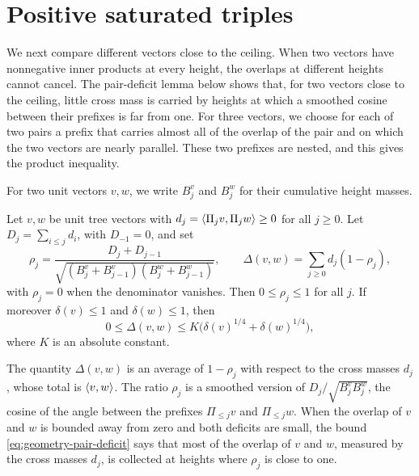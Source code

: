 \section{Positive saturated triples}

We next compare different vectors close to the ceiling. When two vectors have nonnegative inner products at every height, the overlaps at different heights cannot cancel. The pair-deficit lemma below shows that, for two vectors close to the ceiling, little cross mass is carried by heights at which a smoothed cosine between their prefixes is far from one. For three vectors, we choose for each of two pairs a prefix that carries almost all of the overlap of the pair and on which the two vectors are nearly parallel. These two prefixes are nested, and this gives the product inequality.

For two unit vectors $v,w$, we write $B^v_j$ and $B^w_j$ for their cumulative height masses.

\begin{lemma}
\label{lem:geometry-pair-deficit}
Let $v,w$ be unit tree vectors with $d_j=\left\langle\Pi_jv,\Pi_jw\right\rangle\ge0$ for all $j\ge0$. Let $D_j=\sum_{i\le j}d_i$, with $D_{-1}=0$, and set
\[
 \rho_j=\frac{D_j+D_{j-1}}{\sqrt{(B_j^v+B_{j-1}^v)(B_j^w+B_{j-1}^w)}},\qquad
 \Delta(v,w)=\sum_{j\ge0}d_j(1-\rho_j),
\]
with $\rho_j=0$ when the denominator vanishes. Then $0\le\rho_j\le1$ for all $j$. If moreover $\delta(v)\le1$ and $\delta(w)\le1$, then
\begin{equation}
 0\le\Delta(v,w)\le K\bigl(\delta(v)^{1/4}+\delta(w)^{1/4}\bigr),
 \label{eq:geometry-pair-deficit}
\end{equation}
where $K$ is an absolute constant.
\end{lemma}

The quantity $\Delta(v,w)$ is an average of $1-\rho_j$ with respect to the cross masses $d_j$, whose total is $\left\langle v,w\right\rangle$. The ratio $\rho_j$ is a smoothed version of $D_j/\sqrt{B^v_jB^w_j}$, the cosine of the angle between the prefixes $\Pi_{\le j}v$ and $\Pi_{\le j}w$. When the overlap of $v$ and $w$ is bounded away from zero and both deficits are small, the bound \eqref{eq:geometry-pair-deficit} says that most of the overlap of $v$ and $w$, measured by the cross masses $d_j$, is collected at heights where $\rho_j$ is close to one.

